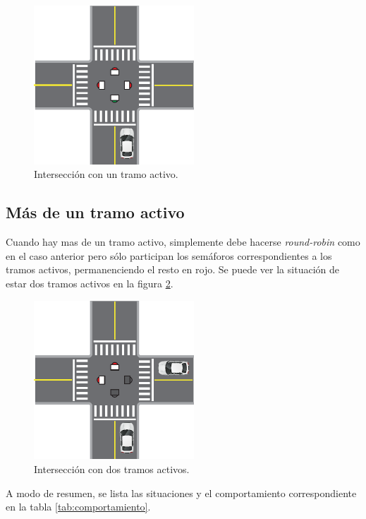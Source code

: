 		\begin{figure}[htbp]
			\centering
			\includegraphics[width=6cm]{imagenes/un-activo.eps}
			\caption{Intersección con un tramo activo.}
			\label{fig:un-activo}
		\end{figure}



	\subsection{Más de un tramo activo}

		Cuando hay mas de un tramo activo, simplemente debe hacerse \emph{round-robin} como en el caso anterior pero sólo participan los semáforos correspondientes a los tramos activos, permanenciendo el resto en rojo.
		Se puede ver la situación de estar dos tramos activos en la figura \ref{fig:dos-activos}.

		\begin{figure}[htbp]
			\centering
			\includegraphics[width=6cm]{imagenes/dos-activos.eps}
			\caption{Intersección con dos tramos activos.}
			\label{fig:dos-activos}
		\end{figure}

		A modo de resumen, se lista las situaciones y el comportamiento correspondiente en la tabla \ref{tab:comportamiento}.

